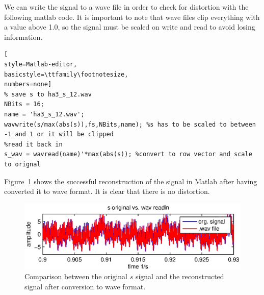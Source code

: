 We can write the signal to a wave file in order to check for distortion with the following matlab code. It is important to note
that wave files clip everything with a value above 1.0, so the signal must be scaled on write and read to avoid losing information.
\begin{lstlisting}[
style=Matlab-editor,
basicstyle=\ttfamily\footnotesize,
numbers=none]
% save s to ha3_s_12.wav
NBits = 16;
name = 'ha3_s_12.wav';
wavwrite(s/max(abs(s)),fs,NBits,name); %s has to be scaled to between -1 and 1 or it will be clipped
%read it back in
s_wav = wavread(name)'*max(abs(s)); %convert to row vector and scale to orignal
\end{lstlisting}

Figure~\ref{fig:1.2-4} shows the successful reconstruction of the signal in Matlab after having converted it to wave format. It
is clear that there is no distortion.


\begin{figure}[H]
	\center
	\includegraphics{./picture/3-1-6.eps}
	\caption{Comparison between the original \(s\) signal and the reconstructed signal after conversion to wave format.}
	\label{fig:1.2-4}
\end{figure}
